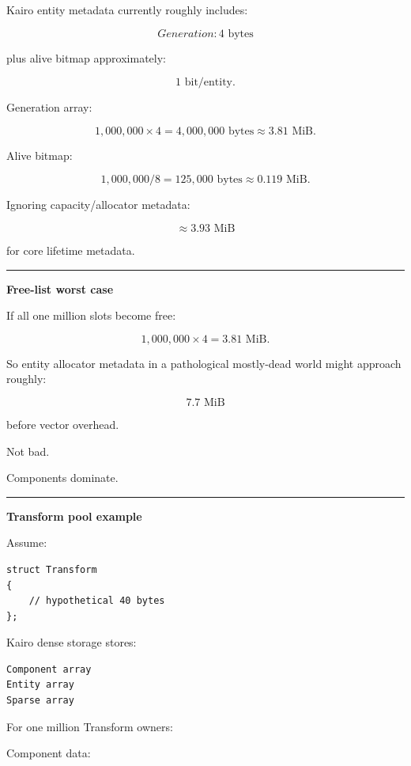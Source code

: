 Kairo entity metadata currently roughly includes:

\[
Generation:4\text{ bytes}
\]

plus  alive bitmap approximately:

\[
1\text{ bit/entity}.
\]

Generation array:

\[
1,000,000\times4
=
4,000,000\text{ bytes}
\approx3.81\text{ MiB}.
\]

Alive bitmap:

\[
1,000,000/8
=
125,000\text{ bytes}
\approx0.119\text{ MiB}.
\]

Ignoring capacity/allocator metadata:

\[
\approx3.93\text{ MiB}
\]

for core lifetime metadata.

\begin{center}\rule{0.5\linewidth}{0.5pt}\end{center}

\textbf{Free-list worst case}

If all one million slots become free:

\[
1,000,000\times4
=
3.81\text{ MiB}.
\]

So entity allocator metadata in a pathological mostly-dead world might approach roughly:

\[
7.7\text{ MiB}
\]

before vector overhead.

Not bad.

Components dominate.

\begin{center}\rule{0.5\linewidth}{0.5pt}\end{center}

\textbf{Transform pool example}

Assume:

\begin{verbatim}
struct Transform
{
    // hypothetical 40 bytes
};
\end{verbatim}

Kairo dense storage stores:

\begin{verbatim}
Component array
Entity array
Sparse array
\end{verbatim}

For one million Transform owners:

Component data:

